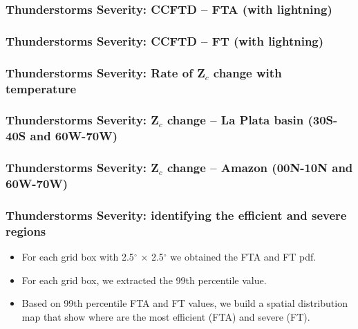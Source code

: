 \documentclass[smaller]{beamer}
\begin{document}
\begin{frame}
\frametitle{Thunderstorms Severity: CCFTD --  FTA (with lightning)}

\end{frame}
\begin{frame}
\frametitle{Thunderstorms Severity: CCFTD -- FT (with lightning)}

\end{frame}


\begin{frame}
\frametitle{Thunderstorms Severity: Rate of Z$_c$ change with temperature}

\end{frame}



\begin{frame}
\frametitle{Thunderstorms Severity: Z$_c$ change -- La Plata basin (30S-40S and 60W-70W)}

\end{frame}

\begin{frame}
\frametitle{Thunderstorms Severity: Z$_c$ change -- Amazon (00N-10N and 60W-70W)}

\end{frame}


\begin{frame}
\frametitle{Thunderstorms Severity: identifying the efficient and severe regions}
\begin{itemize}
\item For each grid box with 2.5$^{\circ}$ $\times$ 2.5$^{\circ}$ we obtained the FTA and FT pdf.
\item For each grid box, we extracted the 99th percentile value. 
\item Based on 99th percentile FTA and FT values, we build a spatial distribution map that show where are the most efficient (FTA) and severe (FT).
\end{itemize}
\end{frame}
\end{document}
